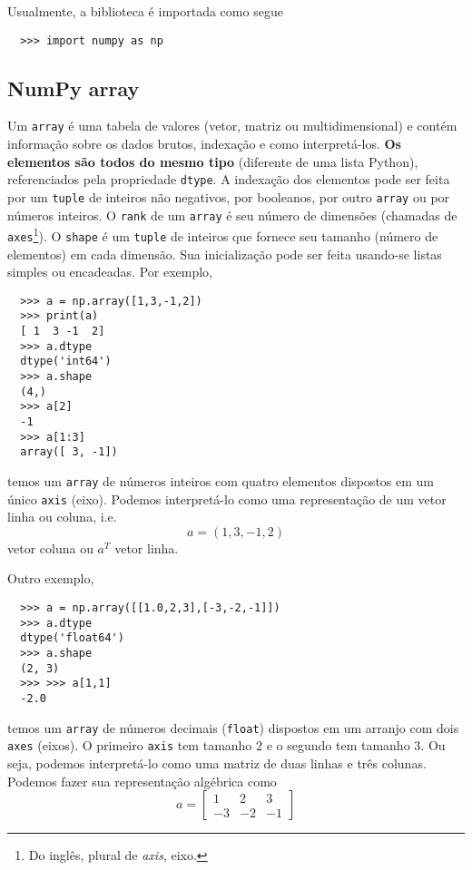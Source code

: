 \documentclass[12pt]{article}
\begin{document}
Usualmente, a biblioteca é importada como segue
\begin{lstlisting}
  >>> import numpy as np
\end{lstlisting}

\subsection{NumPy array}

Um \lstinline+array+ é uma tabela de valores (vetor, matriz ou multidimensional) e contém informação sobre os dados brutos, indexação e como interpretá-los. {\bf Os elementos são todos do mesmo tipo} (diferente de uma lista Python), referenciados pela propriedade \lstinline+dtype+. A indexação dos elementos pode ser feita por um \lstinline+tuple+ de inteiros não negativos, por booleanos, por outro \lstinline+array+ ou por números inteiros. O \lstinline+rank+ de um \lstinline+array+ é seu número de dimensões (chamadas de \lstinline+axes+\footnote{Do inglês, plural de {\it axis}, eixo.}). O \lstinline+shape+ é um \lstinline+tuple+ de inteiros que fornece seu tamanho (número de elementos) em cada dimensão. Sua inicialização pode ser feita usando-se listas simples ou encadeadas. Por exemplo,
\begin{lstlisting}
  >>> a = np.array([1,3,-1,2])
  >>> print(a)
  [ 1  3 -1  2]
  >>> a.dtype
  dtype('int64')
  >>> a.shape
  (4,)
  >>> a[2]
  -1
  >>> a[1:3]
  array([ 3, -1])
\end{lstlisting}
temos um \lstinline+array+ de números inteiros com quatro elementos dispostos em um único \lstinline+axis+ (eixo). Podemos interpretá-lo como uma representação de um vetor linha ou coluna, i.e.
\begin{equation}
  a = (1, 3, -1, 2)
\end{equation}
vetor coluna ou $a^T$ vetor linha.

Outro exemplo,
\begin{lstlisting}
  >>> a = np.array([[1.0,2,3],[-3,-2,-1]])
  >>> a.dtype
  dtype('float64')
  >>> a.shape
  (2, 3)
  >>> >>> a[1,1]
  -2.0
\end{lstlisting}
temos um \lstinline+array+ de números decimais (\lstinline+float+) dispostos em um arranjo com dois \lstinline+axes+ (eixos). O primeiro \lstinline+axis+ tem tamanho $2$ e o segundo tem tamanho $3$. Ou seja, podemos interpretá-lo como uma matriz de duas linhas e três colunas. Podemos fazer sua representação algébrica como
\begin{equation}
  a =
  \begin{bmatrix}
    1 & 2 & 3\\
    -3 & -2 & -1 
  \end{bmatrix}
\end{equation}
\end{document}
